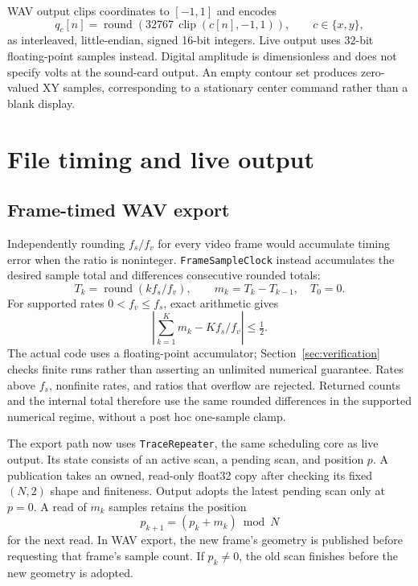 \documentclass[11pt,a4paper]{article}
\newcommand{\code}[1]{\texttt{#1}}
\begin{document}
WAV output clips coordinates to $[-1,1]$ and encodes
\begin{equation}
 q_c[n]=\operatorname{round}\!\left(32767\,
 \operatorname{clip}(c[n],-1,1)\right),\qquad c\in\{x,y\},
\end{equation}
as interleaved, little-endian, signed 16-bit integers. Live output uses 32-bit floating-point samples instead. Digital amplitude is dimensionless and does not specify volts at the sound-card output. An empty contour set produces zero-valued XY samples, corresponding to a stationary center command rather than a blank display.

\section{File timing and live output}
\subsection{Frame-timed WAV export}
Independently rounding $f_s/f_v$ for every video frame would accumulate timing error when the ratio is noninteger. \code{FrameSampleClock} instead accumulates the desired sample total and differences consecutive rounded totals:
\begin{equation}
 T_k=\operatorname{round}(kf_s/f_v),\qquad m_k=T_k-T_{k-1},
 \quad T_0=0.
 \label{eq:clock}
\end{equation}
For supported rates $0<f_v\leq f_s$, exact arithmetic gives
\begin{equation}
 \left|\sum_{k=1}^{K}m_k-Kf_s/f_v\right|\leq\tfrac12.
 \label{eq:clockbound}
\end{equation}
The actual code uses a floating-point accumulator; Section~\ref{sec:verification} checks finite runs rather than asserting an unlimited numerical guarantee. Rates above $f_s$, nonfinite rates, and ratios that overflow are rejected. Returned counts and the internal total therefore use the same rounded differences in the supported numerical regime, without a post hoc one-sample clamp.

The export path now uses \code{TraceRepeater}, the same scheduling core as live output. Its state consists of an active scan, a pending scan, and position $p$. A publication takes an owned, read-only float32 copy after checking its fixed $(N,2)$ shape and finiteness. Output adopts the latest pending scan only at $p=0$. A read of $m_k$ samples retains the position
\begin{equation}
 p_{k+1}=(p_k+m_k)\bmod N
 \label{eq:phase}
\end{equation}
for the next read. In WAV export, the new frame's geometry is published before requesting that frame's sample count. If $p_k\ne0$, the old scan finishes before the new geometry is adopted.
\end{document}
